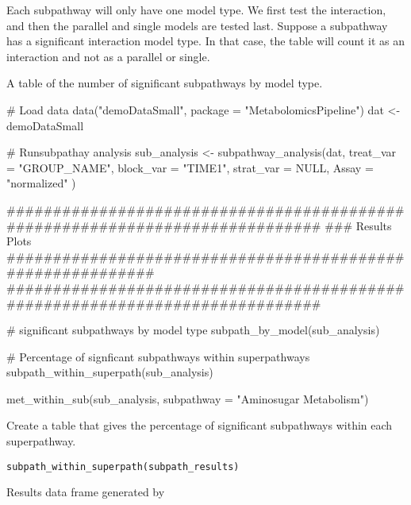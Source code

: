 \documentclass[a4paper]{book}
\begin{document}
%
\begin{Details}
Each subpathway will only have one model type. We first test the interaction,
and then the parallel and single models are tested last. Suppose a
subpathway has a significant interaction model type. In that case, the table
will count it as an interaction and not as a parallel or single.
\end{Details}
%
\begin{Value}
A table of the number of significant subpathways by model type.
\end{Value}
%
\begin{Examples}
\begin{ExampleCode}
# Load data
data("demoDataSmall", package = "MetabolomicsPipeline")
dat <- demoDataSmall

# Runsubpathay analysis
sub_analysis <- subpathway_analysis(dat,
    treat_var = "GROUP_NAME",
    block_var = "TIME1",
    strat_var = NULL,
    Assay = "normalized"
)

#############################################################################
### Results Plots ###########################################################
#############################################################################

# significant subpathways by model type
subpath_by_model(sub_analysis)

# Percentage of signficant subpathways within superpathways
subpath_within_superpath(sub_analysis)

met_within_sub(sub_analysis, subpathway = "Aminosugar Metabolism")

\end{ExampleCode}
\end{Examples}
%
\begin{Description}
Create a table that gives the percentage of significant subpathways within
each superpathway.
\end{Description}
%
\begin{Usage}
\begin{verbatim}
subpath_within_superpath(subpath_results)
\end{verbatim}
\end{Usage}
%
\begin{Arguments}
\begin{ldescription}
\item[\code{subpath\_results}] Results data frame generated by
\end{ldescription}
\end{Arguments}
\end{document}
